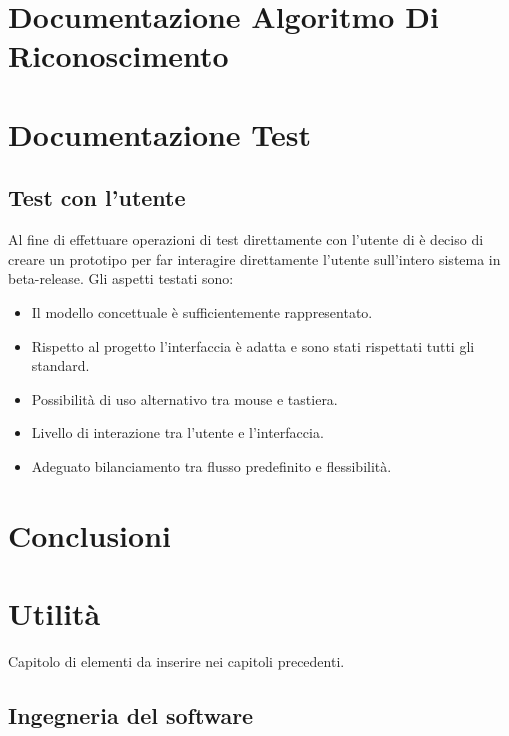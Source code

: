 \documentclass[a4paper,final,12pt]{report}
\begin{document}
\chapter{Documentazione Algoritmo Di Riconoscimento}

\chapter{Documentazione Test}




\section{Test con l'utente}
Al fine di effettuare operazioni di test direttamente con l'utente di è deciso di creare un prototipo per far interagire direttamente l'utente sull'intero sistema in beta-release.
Gli aspetti testati sono:
\begin{itemize}
\item Il modello concettuale è sufficientemente rappresentato.
\item Rispetto al progetto l'interfaccia è adatta e sono stati rispettati tutti gli standard.
\item Possibilità di uso alternativo tra mouse e tastiera.
\item Livello di interazione tra l'utente e l'interfaccia.
\item Adeguato bilanciamento tra flusso predefinito e flessibilità.
\end{itemize}
\chapter{Conclusioni}

\chapter{Utilità}
Capitolo di elementi da inserire nei capitoli precedenti.



\section{Ingegneria del software}
\end{document}
